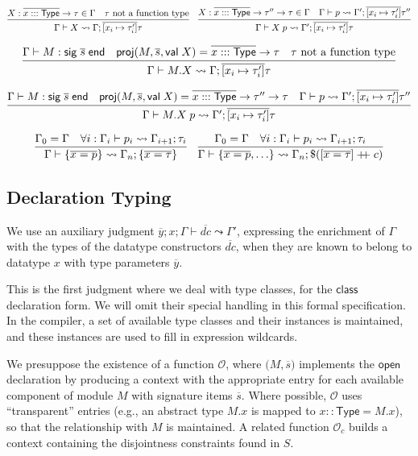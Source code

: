 \documentclass{article}
\newcommand{\mt}[1]{\mathsf{#1}}
\newcommand{\rc}{+ \hspace{-.075in} + \;}
\begin{document}
$$\infer{\Gamma \vdash X \leadsto \Gamma; \overline{[x_i \mapsto \tau'_i]}\tau}{
  X : \overline{x ::: \mt{Type}} \to \tau \in \Gamma
  & \textrm{$\tau$ not a function type}
}
\quad \infer{\Gamma \vdash X \; p \leadsto \Gamma'; \overline{[x_i \mapsto \tau'_i]}\tau}{
  X : \overline{x ::: \mt{Type}} \to \tau'' \to \tau \in \Gamma
  & \Gamma \vdash p \leadsto \Gamma'; \overline{[x_i \mapsto \tau'_i]}\tau''
}$$

$$\infer{\Gamma \vdash M.X \leadsto \Gamma; \overline{[x_i \mapsto \tau'_i]}\tau}{
  \Gamma \vdash M : \mt{sig} \; \overline{s} \; \mt{end}
  & \mt{proj}(M, \overline{s}, \mt{val} \; X) = \overline{x ::: \mt{Type}} \to \tau
  & \textrm{$\tau$ not a function type}
}$$

$$\infer{\Gamma \vdash M.X \; p \leadsto \Gamma'; \overline{[x_i \mapsto \tau'_i]}\tau}{
  \Gamma \vdash M : \mt{sig} \; \overline{s} \; \mt{end}
  & \mt{proj}(M, \overline{s}, \mt{val} \; X) = \overline{x ::: \mt{Type}} \to \tau'' \to \tau
  & \Gamma \vdash p \leadsto \Gamma'; \overline{[x_i \mapsto \tau'_i]}\tau''
}$$

$$\infer{\Gamma \vdash \{\overline{x = p}\} \leadsto \Gamma_n; \{\overline{x = \tau}\}}{
  \Gamma_0 = \Gamma
  & \forall i: \Gamma_i \vdash p_i \leadsto \Gamma_{i+1}; \tau_i
}
\quad \infer{\Gamma \vdash \{\overline{x = p}, \ldots\} \leadsto \Gamma_n; \$([\overline{x = \tau}] \rc c)}{
  \Gamma_0 = \Gamma
  & \forall i: \Gamma_i \vdash p_i \leadsto \Gamma_{i+1}; \tau_i
}$$

\subsection{Declaration Typing}

We use an auxiliary judgment $\overline{y}; x; \Gamma \vdash \overline{dc} \leadsto \Gamma'$, expressing the enrichment of $\Gamma$ with the types of the datatype constructors $\overline{dc}$, when they are known to belong to datatype $x$ with type parameters $\overline{y}$.

This is the first judgment where we deal with type classes, for the $\mt{class}$ declaration form.  We will omit their special handling in this formal specification.  In the compiler, a set of available type classes and their instances is maintained, and these instances are used to fill in expression wildcards.

We presuppose the existence of a function $\mathcal O$, where $\mathcal(M, \overline{s})$ implements the $\mt{open}$ declaration by producing a context with the appropriate entry for each available component of module $M$ with signature items $\overline{s}$.  Where possible, $\mathcal O$ uses ``transparent'' entries (e.g., an abstract type $M.x$ is mapped to $x :: \mt{Type} = M.x$), so that the relationship with $M$ is maintained.  A related function $\mathcal O_c$ builds a context containing the disjointness constraints found in $S$.
\end{document}
